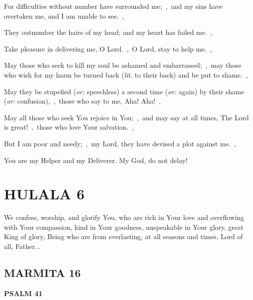 \documentclass[12pt,twoside,a5paper]{article}
\newcommand{\hulala}[1]{\section*{HULALA {#1}}}
\newcommand{\marmita}[1]{\subsection*{MARMITA {#1}}}
\newcommand{\psalm}[1]{\textbf{PSALM {#1}}\nopagebreak}
\newcommand{\slota}[1]{\liturgicalhint{Slota.} #1}
\newcommand{\translationoption}[1]{\emph{or:} #1}
\newcommand{\translationliteral}[1]{\emph{lit.} #1}
\begin{document}
\begin{normalparskip}
  For difficulties without number have surrounded me;~\sep\ and my sins have overtaken me, and I am unable to see.~\sep

  They outnumber the hairs of my head; and my heart has failed me.~\sep

  Take pleasure in delivering me, O Lord.~\sep\ O Lord, stay to help me.~\sep

  May those who seek to kill my soul be ashamed and embarrassed;~\sep\ may those who wish for my harm be turned back (\translationliteral{to their back}) and be put to shame.~\sep

  May they be stupefied (\translationoption{speechless}) a second time (\translationoption{again}) by their shame (\translationoption{confusion}),~\sep\ those who say to me, Aha! Aha!~\sep

  May all those who seek You rejoice in You;~\sep\ and may say at all times, The Lord is great!~\sep\ those who love Your salvation.~\sep

  But I am poor and needy;~\sep\ my Lord, they have devised a plot against me.~\sep

  You are my Helper and my Deliverer. My God, do not delay!
\end{normalparskip}


\hulala{6}

\slota{We confess, worship, and glorify You, who are rich in Your love and overflowing with Your compassion, kind in Your goodness, unspeakable in Your glory, great King of glory, Being who are from everlasting, at all seasons and times, Lord of all, Father...}

\marmita{16}

\psalm{41}
\end{document}
